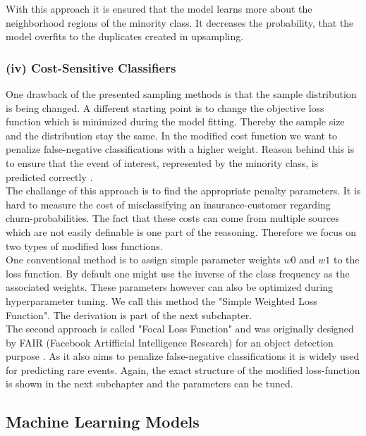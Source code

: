 \documentclass[12pt,titlepage]{article}
\begin{document}
With this approach it is ensured that the model learns more about the neighborhood regions of the minority class. It decreases the probability, that the model overfits to the duplicates created in upsampling. \\

\subsubsection*{(iv) Cost-Sensitive Classifiers} \label{Cost-Sensitive Classifiers}
One drawback of the presented sampling methods is that the sample distribution is being changed. A different starting point is to change the objective loss function which is minimized during the model fitting. Thereby the sample size and the distribution stay the same. In the modified cost function we want to penalize false-negative
classifications with a higher weight. Reason behind this is to ensure that the event of interest, represented by the minority class, is predicted correctly \cite{cost_sensitive}. \\
The challange of this approach is to find the appropriate penalty parameters. It is hard to measure the cost of misclassifying an insurance-customer regarding churn-probabilities. The fact that these costs can come from multiple sources which are not easily definable is one part of the reasoning. Therefore we focus on two types of modified loss functions.\\
One conventional method is to assign simple parameter weights $w0$ and $w1$ to the loss function. By default one might use the inverse of the class frequency as the associated weights. These parameters however can also be optimized during hyperparameter tuning. We call this method the "Simple Weighted Loss Function". The derivation is part of the next subchapter.\\
The second approach is called "Focal Loss Function" and was originally designed by FAIR (Facebook Artifficial Intelligence Research) for an object detection purpose \cite{focal}. As it also aims to penalize false-negative classifications it is widely used for predicting rare events. Again, the exact structure of the modified loss-function is shown in the next subchapter and the parameters can be tuned.\\


\subsection{Machine Learning Models} \par
\end{document}
